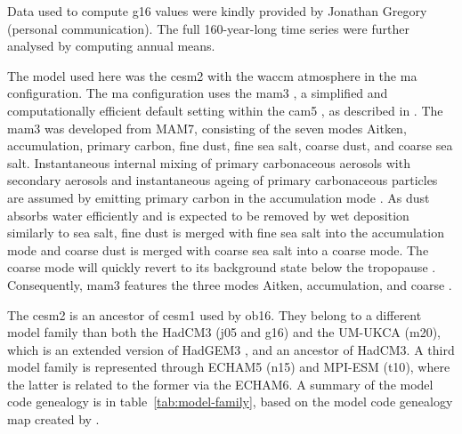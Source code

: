 \documentclass{ametsocV6.1}
\begin{document}
Data used to compute \gls{g16} values were kindly provided by Jonathan Gregory (personal
communication). The full 160-year-long time series were further analysed by computing
annual means.

\appendix[C]


The model used here was the \gls{cesm2} with the \gls{waccm} atmosphere in the \gls{ma}
configuration. The \gls{ma} configuration uses the \gls{mam3} \citep{gettleman2019}, a
simplified and computationally efficient default setting within the \gls{cam5}
\citep{liu2016}, as described in \citet{liu2012}. The \gls{mam3} was developed from
MAM7, consisting of the seven modes Aitken, accumulation, primary carbon, fine dust,
fine sea salt, coarse dust, and coarse sea salt. Instantaneous internal mixing of
primary carbonaceous aerosols with secondary aerosols and instantaneous ageing of
primary carbonaceous particles are assumed by emitting primary carbon in the
accumulation mode \citep{liu2016}. As dust absorbs water efficiently and is expected to
be removed by wet deposition similarly to sea salt, fine dust is merged with fine sea
salt into the accumulation mode and coarse dust is merged with coarse sea salt into a
coarse mode. The coarse mode will quickly revert to its background state below the
tropopause \citep{liu2012}. Consequently, \gls{mam3} features the three modes Aitken,
accumulation, and coarse \citep{liu2016}.

The \gls{cesm2} is an ancestor of \gls{cesm1} used by \gls{ob16}. They belong to a
different model family than both the HadCM3 (\gls{j05} and \gls{g16}) and the UM-UKCA
(\gls{m20}), which is an extended version of HadGEM3 \citep{dhomse2014}, and an ancestor
of HadCM3. A third model family is represented through ECHAM5 (\gls{n15}) and MPI-ESM
(\gls{t10}), where the latter is related to the former via the ECHAM6. A summary of the
model code genealogy is in table~\ref{tab:model-family}, based on the model code
genealogy map created by \citet{kuma2023}.
\end{document}
